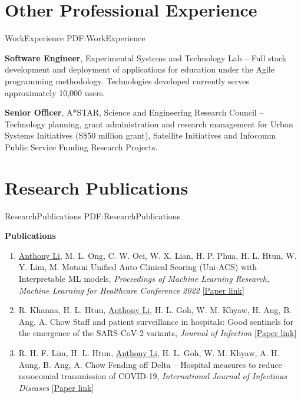 \documentclass[letterpaper,10pt,oneside]{article}
\begin{document}
\begin{body}
\section
{Other Professional Experience}
{WorkExperience}
{PDF:WorkExperience}

{\textbf{Software Engineer}, Experimental Systems and Technology Lab}
\hfill
{} --
\BulletItem
Full stack development and deployment of applications for education under the Agile programming methodology. Technologies developed currently serves approximately 10,000 users.

\BigGap
{\textbf{Senior Officer}, A*STAR, Science and Engineering Research Council}
\hfill
{} --
\BulletItem
Technology planning, grant administration and research management for Urban Systems Initiatives (S\$50 million grant), Satellite Initiatives and Infocomm Public Service Funding Research Projects.



\section
{Research Publications}
{ResearchPublications}
{PDF:ResearchPublications}

\textbf{Publications}
\GapNoBreak
{}

\begin{enumerate}
\item \underline{Anthony Li}, M. L. Ong, C. W. Oei, W. X. Lian, H. P. Phua, H. L. Htun, W. Y. Lim, M. Motani \textcolor{mygray}{Unified Auto Clinical Scoring (Uni-ACS) with Interpretable ML models}, \textit{Proceedings of Machine Learning Research, Machine Learning for Healthcare Conference 2022 }[\href{https://static1.squarespace.com/static/59d5ac1780bd5ef9c396eda6/t/62e975060329a7015f4f6eab/1659467015391/15+MLHC2022_Uni_ACS_Camera_Ready.pdf}{Paper link}]


\item R. Khanna, H. L. Htun, \underline{Anthony Li}, H. L. Goh, W. M. Khyaw, H. Ang, B. Ang, A. Chow \textcolor{mygray}{Staff and patient surveillance in hospitals: Good sentinels for the emergence of the SARS-CoV-2 variants}, \textit{Journal of Infection }[\href{https://www.journalofinfection.com/article/S0163-4453(22)00411-X/fulltext}{Paper link}]


\item R. H. F. Lim, H. L. Htun, \underline{Anthony Li}, H. L. Goh, W. M. Khyaw, A. H. Aung, B. Ang, A. Chow \textcolor{mygray}{Fending off Delta – Hospital measures to reduce nosocomial transmission of COVID-19}, \textit{International Journal of Infectious Diseases }[\href{https://www.ijidonline.com/article/S1201-9712(22)00077-7/fulltext}{Paper link}]



\end{enumerate}
\end{body}
\end{document}
